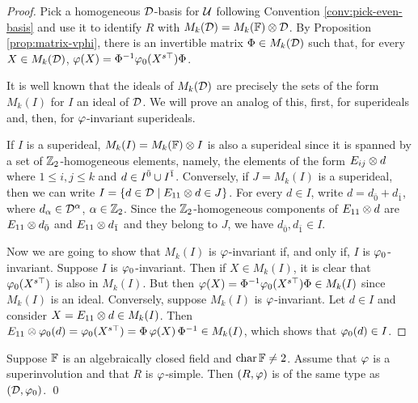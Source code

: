 \begin{proof}
	Pick a homogeneous $\mathcal{D}$-basis for $\mathcal U$ following Convention \ref{conv:pick-even-basis} and use it to identify $R$ with $M_k(\mathcal{D}) = M_k(\mathbb{F}) \otimes \mathcal{D}$.
	By Proposition \ref{prop:matrix-vphi}, there is an invertible matrix $\Phi \in M_k(\mathcal{D})$ such that, for every $X \in M_k(\mathcal{D})$,
	$\varphi(X) = \Phi^{-1} \varphi_0(X^{s\top}) \Phi$.

	It is well known that the ideals of $M_k(\mathcal{D})$ are precisely the sets of the form $M_k(I)$ for $I$ an ideal of $\mathcal{D}$.
	We will prove an analog of this, first, for superideals and, then, for $\varphi$-invariant superideals.

	If $I$ is a superideal, $M_k(I) = M_k(\mathbb{F}) \otimes I$ is also a superideal since it is spanned by a set of $\mathbb{Z}_2$-homogeneous elements, namely, the elements of the form $E_{ij}\otimes d$ where $1 \leq i,j \leq k$ and $d \in I^{\bar0} \cup I^{\bar1}$.
	Conversely, if $J = M_k(I)$ is a superideal, then we can write $I = \{ d\in  \mathcal{D} \mid E_{11}\otimes d \in J\}$.
	For every $d\in I$, write $d = d_{\bar 0} + d_{\bar 1}$, where $d_\alpha \in \mathcal{D}^\alpha$, $\alpha \in \mathbb{Z}_2$.
	Since the $\mathbb{Z}_2$-homogeneous components of $E_{11}\otimes d$ are $E_{11}\otimes d_{\bar 0}$ and $E_{11}\otimes d_{\bar 1}$ and they belong to $J$, we have $d_{\bar 0}, d_{\bar 1} \in I$.

	Now we are going to show that $M_k(I)$ is $\varphi$-invariant if, and only if, $I$ is $\varphi_0$-invariant.
	Suppose $I$ is $\varphi_0$-invariant.
	Then if $X \in M_k(I)$, it is clear that $\varphi_0 (X^{s\top})$ is also in $M_k(I)$.
	But then $\varphi(X) = \Phi^{-1} \varphi_0(X^{s\top}) \Phi \in M_k(I)$ since $M_k(I)$ is an ideal.
	Conversely, suppose $M_k(I)$ is $\varphi$-invariant.
	Let $d \in I$ and consider $X = E_{11} \otimes d \in M_k(I)$.
	Then $E_{11} \otimes \varphi_0(d) = \varphi_0(X^{s\top}) = \Phi\, \varphi(X)\, \Phi^{-1} \in M_k(I)$, which shows that $\varphi_0(d) \in I$.
\end{proof}

\begin{cor}\label{cor:D-has-the-same-type}
	Suppose $\mathbb{F}$ is an algebraically closed field and $\operatorname{char} \mathbb{F} \neq 2$.
	Assume that $\varphi$ is a superinvolution and that $R$ is $\varphi$-simple.
	Then $(R, \varphi)$ is of the same type as $(\mathcal{D}, \varphi_0)$. \qed
\end{cor}

